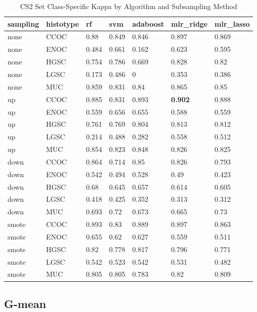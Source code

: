 \documentclass[
]{report}
\begin{document}
\begin{table}

\caption{\label{tab:cs2-kappa-class-table}CS2 Set Class-Specific Kappa by Algorithm and Subsampling Method}
\centering
\begin{tabular}[t]{l|l|l|l|l|l|l}
\hline
sampling & histotype & rf & svm & adaboost & mlr\_ridge & mlr\_lasso\\
\hline
none & CCOC & 0.88 & 0.849 & 0.846 & 0.897 & 0.869\\
\hline
none & ENOC & 0.484 & 0.661 & 0.162 & 0.623 & 0.595\\
\hline
none & HGSC & 0.754 & 0.786 & 0.669 & 0.828 & 0.82\\
\hline
none & LGSC & 0.173 & 0.486 & 0 & 0.353 & 0.386\\
\hline
none & MUC & 0.859 & 0.831 & 0.84 & 0.865 & 0.85\\
\hline
up & CCOC & 0.885 & 0.831 & 0.893 & \textbf{0.902} & 0.888\\
\hline
up & ENOC & 0.559 & 0.656 & 0.655 & 0.588 & 0.559\\
\hline
up & HGSC & 0.761 & 0.769 & 0.804 & 0.813 & 0.812\\
\hline
up & LGSC & 0.214 & 0.488 & 0.282 & 0.558 & 0.512\\
\hline
up & MUC & 0.854 & 0.823 & 0.848 & 0.826 & 0.825\\
\hline
down & CCOC & 0.864 & 0.714 & 0.85 & 0.826 & 0.793\\
\hline
down & ENOC & 0.542 & 0.494 & 0.528 & 0.49 & 0.423\\
\hline
down & HGSC & 0.68 & 0.645 & 0.657 & 0.614 & 0.605\\
\hline
down & LGSC & 0.418 & 0.425 & 0.352 & 0.313 & 0.312\\
\hline
down & MUC & 0.693 & 0.72 & 0.673 & 0.665 & 0.73\\
\hline
smote & CCOC & 0.893 & 0.83 & 0.889 & 0.897 & 0.863\\
\hline
smote & ENOC & 0.655 & 0.62 & 0.627 & 0.559 & 0.511\\
\hline
smote & HGSC & 0.82 & 0.778 & 0.817 & 0.796 & 0.771\\
\hline
smote & LGSC & 0.542 & 0.523 & 0.542 & 0.531 & 0.482\\
\hline
smote & MUC & 0.805 & 0.805 & 0.783 & 0.82 & 0.809\\
\hline
\end{tabular}
\end{table}

\hypertarget{g-mean-2}{%
\subsection{G-mean}\label{g-mean-2}}
\end{document}
